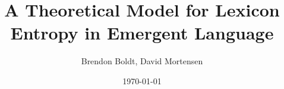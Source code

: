 \documentclass{beamer}
\title{A Theoretical Model for Lexicon Entropy in Emergent Language}
\author{Brendon Boldt, David Mortensen}
\date{\today}
\begin{document}
\maketitle

\end{document}
